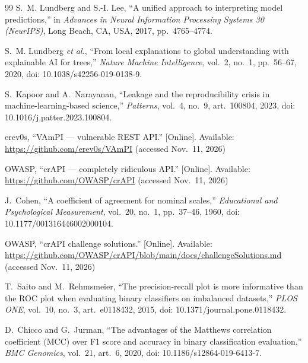 \documentclass[conference]{IEEEtran}
\begin{document}
\begin{thebibliography}{99}
S.~M. Lundberg and S.-I. Lee, ``A unified approach to interpreting model predictions,'' in
\emph{Advances in Neural Information Processing Systems 30 (NeurIPS)}, Long Beach, CA, USA,
2017, pp.~4765--4774.

S.~M. Lundberg \emph{et al.}, ``From local explanations to global understanding with explainable
{AI} for trees,'' \emph{Nature Machine Intelligence}, vol.~2, no.~1, pp.~56--67, 2020, doi:
10.1038/s42256-019-0138-9.

S.~Kapoor and A.~Narayanan, ``Leakage and the reproducibility crisis in machine-learning-based
science,'' \emph{Patterns}, vol.~4, no.~9, art.~100804, 2023, doi: 10.1016/j.patter.2023.100804.

erev0s, ``VAmPI --- vulnerable REST API.'' [Online]. Available:
\url{https://github.com/erev0s/VAmPI} (accessed Nov.~11, 2026)

OWASP, ``crAPI --- completely ridiculous API.'' [Online]. Available:
\url{https://github.com/OWASP/crAPI} (accessed Nov.~11, 2026)

J.~Cohen, ``A coefficient of agreement for nominal scales,'' \emph{Educational and Psychological
Measurement}, vol.~20, no.~1, pp.~37--46, 1960, doi: 10.1177/001316446002000104.

OWASP, ``crAPI challenge solutions.'' [Online]. Available:
\url{https://github.com/OWASP/crAPI/blob/main/docs/challengeSolutions.md} (accessed Nov.~11, 2026)

T.~Saito and M.~Rehmsmeier, ``The precision-recall plot is more informative than the {ROC} plot
when evaluating binary classifiers on imbalanced datasets,'' \emph{PLOS ONE}, vol.~10, no.~3,
art.~e0118432, 2015, doi: 10.1371/journal.pone.0118432.

D.~Chicco and G.~Jurman, ``The advantages of the {Matthews} correlation coefficient ({MCC}) over
{F1} score and accuracy in binary classification evaluation,'' \emph{BMC Genomics}, vol.~21,
art.~6, 2020, doi: 10.1186/s12864-019-6413-7.

\end{thebibliography}
\end{document}

